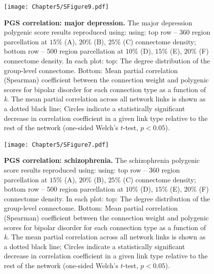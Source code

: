 \begin{figure}[h!]
\begin{center}
\texttt{[image: Chapter5/SFigure9.pdf]}%
\end{center}
\caption{\textbf{PGS correlation: major depression.}
The major depression polygenic score results reproduced using: using: top row --  360 region parcellation at $15\%$ (A), $20\%$ (B), $25\%$ (C) connectome density; bottom row -- 500 region parcellation at $10\%$ (D), $15\%$ (E), $20\%$ (F) connectome density. In each plot: top: The degree distribution of the group-level connectome. Bottom: Mean partial correlation (Spearman) coefficient between the connection weight and polygenic scores for bipolar disorder for each connection type as a function of \textit{k}. The mean partial correlation across all network links is shown as a dotted black line; Circles indicate a statistically significant decrease in correlation coefficient in a given link type relative to the rest of the network (one-sided Welch's $t$-test, $p < 0.05$).}
\label{fig:Ch5SFig9}
\end{figure}

\begin{figure}[h!]
\begin{center}
\texttt{[image: Chapter5/SFigure7.pdf]}%
\end{center}
\caption{\textbf{PGS correlation: schizophrenia.}
The schizophrenia polygenic score results reproduced using: using: top row -- 360 region parcellation at $15\%$ (A), $20\%$ (B), $25\%$ (C) connectome density; bottom row -- 500 region parcellation at $10\%$ (D), $15\%$ (E), $20\%$ (F) connectome density. In each plot: top: The degree distribution of the group-level connectome. Bottom: Mean partial correlation (Spearman) coefficient between the connection weight and polygenic scores for bipolar disorder for each connection type as a function of \textit{k}. The mean partial correlation across all network links is shown as a dotted black line; Circles indicate a statistically significant decrease in correlation coefficient in a given link type relative to the rest of the network (one-sided Welch's $t$-test, $p < 0.05$).}
\label{fig:Ch5SFig7}
\end{figure}

